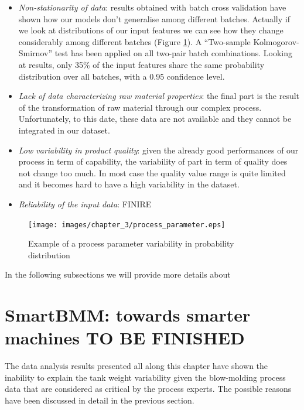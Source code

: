 \begin{itemize}
    \item \textit{Non-stationarity of data}: results obtained with batch cross validation have shown how our models don’t generalise among different batches. Actually if we look at distributions of our input features we can see how they change considerably among different batches (Figure \ref{fig:Example of a process parameter variability in probability distribution}). A “Two-sample Kolmogorov-Smirnov” test has been applied on all two-pair batch combinations. Looking at results, only 35\% of the input features share the same probability distribution over all batches, with a 0.95 confidence level.
    \item \textit{Lack of data characterizing raw material properties}: the final part is the result of the transformation of raw material through our complex process. Unfortunately, to this date, these data are not available and they cannot be integrated in our dataset.
    \item \textit{Low variability in product quality}: given the already good performances of our process in term of capability, the variability of part in term of quality does not change too much. In most case the quality value range is quite limited and it becomes hard to have a high variability in the dataset.
    \item \textit{Reliability of the input data}: FINIRE
\end{itemize}

\begin{figure}
\centerline{\texttt{[image: images/chapter\_3/process\_parameter.eps]}}
\caption{Example of a process parameter variability in probability distribution}
\label{fig:Example of a process parameter variability in probability distribution}
\end{figure}


In the following subsections we will provide more details about 



\section{SmartBMM: towards smarter machines TO BE FINISHED}

The data analysis results presented all along this chapter have shown the inability to explain the tank weight variability given the blow-molding process data that are considered as critical by the process experts. The possible reasons have been discussed in detail in the previous section.

